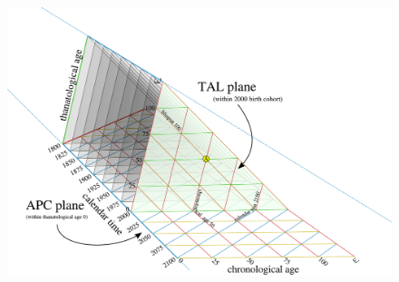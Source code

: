 \documentclass[12pt,oneside,a4paper,doublespacing]{article} %
\theoremstyle{definition}
\begin{document}
\begin{figure}[!h]
\centering
\caption{~}
\includegraphics[scale=.5]{TALisomarkedup2.pdf}
\end{figure}
\end{document}
